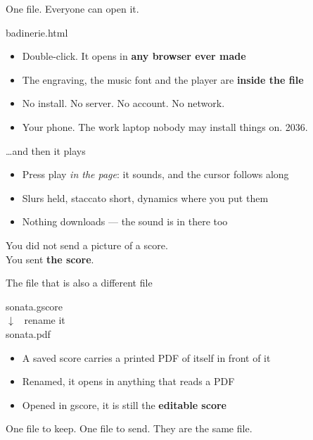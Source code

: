 \documentclass[aspectratio=169,12pt]{beamer}
\newcommand{\hi}[1]{{\color{accent}\textbf{#1}}}
\newcommand{\punch}[1]{\begin{center}{\large #1}\end{center}}
\begin{document}

\begin{frame}{One file. Everyone can open it.}
  \vspace{0.5em}
  \begin{center}
    {\Large\ttfamily badinerie.html}
  \end{center}
  \vspace{1.3em}
  \begin{itemize}\setlength\itemsep{0.75em}
    \item Double-click. It opens in \hi{any browser ever made}
    \item The engraving, the music font and the player are \hi{inside the file}
    \item No install. No server. No account. No network.
    \item Your phone. The work laptop nobody may install things on. 2036.
  \end{itemize}
\end{frame}

\begin{frame}{\dots and then it plays}
  \vspace{1.0em}
  \begin{itemize}\setlength\itemsep{0.9em}
    \item Press play \emph{in the page}: it sounds, and the cursor follows along
    \item Slurs held, staccato short, dynamics where you put them
    \item Nothing downloads --- the sound is in there too
  \end{itemize}
  \vspace{1.6em}
  \punch{You did not send a picture of a score.\\
  You sent \hi{the score}.}
\end{frame}


\begin{frame}{The file that is also a different file}
  \vspace{0.6em}
  \begin{center}
    {\large\ttfamily sonata.gscore}\\[0.5em]
    {\large $\downarrow$ \ \color{quiet}rename it}\\[0.5em]
    {\large\ttfamily sonata.pdf}
  \end{center}
  \vspace{1.2em}
  \begin{itemize}\setlength\itemsep{0.7em}
    \item A saved score carries a printed PDF of itself in front of it
    \item Renamed, it opens in anything that reads a PDF
    \item Opened in gscore, it is still the \hi{editable score}
  \end{itemize}
  \vspace{0.7em}
  \punch{\color{quiet}One file to keep. One file to send. They are the same file.}
\end{frame}
\end{document}
